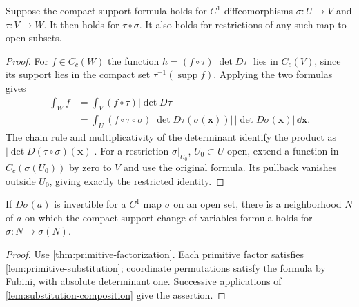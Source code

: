 \begin{lemma}\label{lem:substitution-composition}
Suppose the compact-support formula holds for $C^1$ diffeomorphisms
$\sigma:U\to V$ and $\tau:V\to W$. It then holds for $\tau\circ\sigma$.
It also holds for restrictions of any such map to open subsets.
\end{lemma}
\begin{proof}
For $f\in C_c(W)$ the function $h=(f\circ\tau)|\det D\tau|$ lies
in $C_c(V)$, since its support lies in the compact set
$\tau^{-1}(\operatorname{supp}f)$. Applying the two formulas gives
\[
\begin{aligned}
\int_W f
 &=\int_V(f\circ\tau)|\det D\tau|\\
 &=\int_U(f\circ\tau\circ\sigma)
       |\det D\tau(\sigma(\mathbf{x}))|\,|\det D\sigma(\mathbf{x})|\,\dd\mathbf{x}.
\end{aligned}
\]
The chain rule and multiplicativity of the determinant identify the
product as $|\det D(\tau\circ\sigma)(\mathbf{x})|$.
For a restriction $\sigma|_{U_0}$, $U_0\subset U$ open, extend a function in
$C_c(\sigma(U_0))$ by zero to $V$ and use the original formula. Its
pullback vanishes outside $U_0$, giving exactly the restricted identity.
\end{proof}

\begin{corollary}\label{cor:local-structural-change}
If $D\sigma(a)$ is invertible for a $C^1$ map $\sigma$ on an open set,
there is a neighborhood $N$ of $a$ on which the compact-support
change-of-variables formula holds for $\sigma:N\to\sigma(N)$.
\end{corollary}
\begin{proof}
Use \cref{thm:primitive-factorization}. Each primitive factor satisfies
\cref{lem:primitive-substitution}; coordinate permutations satisfy the
formula by Fubini, with absolute determinant one. Successive applications
of \cref{lem:substitution-composition} give the assertion.
\end{proof}

